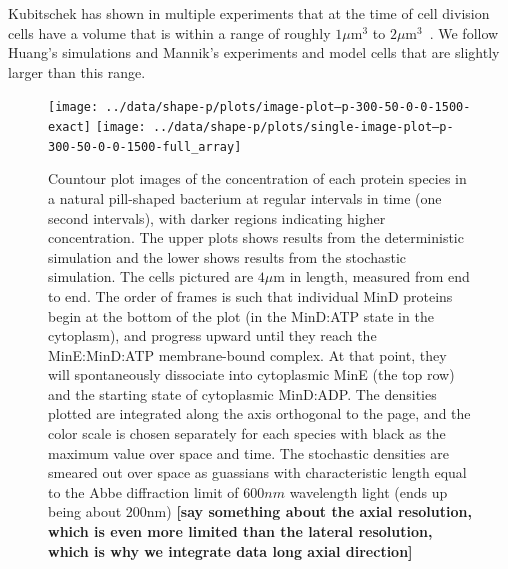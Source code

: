 \documentclass[letterpaper,twocolumn,amsmath,amssymb,pre]{revtex4-1}
\newcommand{\red}[1]{{\bf \color{red} #1}}
\newcommand{\fixme}[1]{\red{[#1]}}
\newcommand\micron{\ensuremath{\mu\text{m}}}
\begin{document}

Kubitschek has shown in multiple experiments that at the time of cell
division cells have a volume that is within a range of roughly
$1\micron^3$ to $2\micron^3$~\cite{kubitschek1990cell,
  kubitschek1968linear}.  We follow Huang's
simulations\cite{huang2003dynamic} and Mannik's experiments and model
cells that are slightly larger than this range.

\begin{figure}
  \texttt{[image: ../data/shape-p/plots/image-plot--p-300-50-0-0-1500-exact]}
  \texttt{[image: ../data/shape-p/plots/single-image-plot--p-300-50-0-0-1500-full\_array]}
  \caption{Countour plot images of the concentration of each protein
    species in a natural pill-shaped bacterium at regular intervals in
    time (one second intervals), with darker regions indicating higher
    concentration. The upper plots shows results from the
    deterministic simulation and the lower shows results from the
    stochastic simulation.  The cells pictured are $4\micron$ in
    length, measured from end to end.  The order of frames is such
    that individual MinD proteins begin at the bottom of the plot (in
    the MinD:ATP state in the cytoplasm), and progress upward until
    they reach the MinE:MinD:ATP membrane-bound complex.  At that
    point, they will spontaneously dissociate into cytoplasmic MinE
    (the top row) and the starting state of cytoplasmic MinD:ADP.  The
    densities plotted are integrated along the axis orthogonal to the
    page, and the color scale is chosen separately for each species
    with black as the maximum value over space and time.  The
    stochastic densities are smeared out over space as guassians with
    characteristic length equal to the Abbe diffraction limit of
    $600nm$ wavelength light (ends up being about 200nm)\fixme{say
      something about the axial resolution, which is even more limited
      than the lateral resolution, which is why we integrate data long
      axial direction}}
  \label{image-p}
\end{figure}
\end{document}
